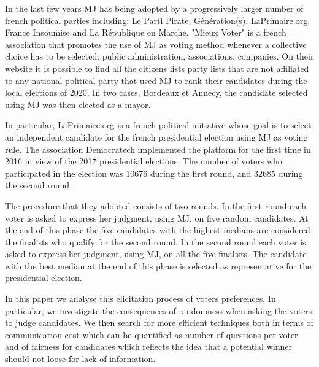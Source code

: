 In the last few years \ac{MJ} has being adopted by a progressively larger number of french political parties including: Le Parti Pirate, Génération(s), LaPrimaire.org, France Insoumise and La République en Marche.
"Mieux Voter" \citep{MV} is a french association that promotes the use of \ac{MJ} as voting method whenever a collective choice has to be selected: public administration, associations, companies. On their website it is possible to find all the citizens lists \textendash party lists that are not affiliated to any national political party \textemdash that used \ac{MJ} to rank their candidates during the local elections of 2020. In two cases, Bordeaux et Annecy, the candidate selected using \ac{MJ} was then elected as a mayor. 

In particular, LaPrimaire.org \citep{LaPrimaire} is a french political initiative whose goal is to select an independent candidate for the french presidential election using \ac{MJ} as voting rule. The association Democratech implemented the platform for the first time in 2016 in view of the 2017 presidential elections. The number of voters who participated in the election was $10676$ during the first round, and $32685$ during the second round. 

The procedure that they adopted consists of two rounds. In the first round each voter is asked to express her judgment, using \ac{MJ}, on five random candidates. At the end of this phase the five candidates with the highest medians are considered the finalists who qualify for the second round. In the second round each voter is asked to express her judgment, using \ac{MJ}, on all the five finalists. The candidate with the best median at the end of this phase is selected as representative for the presidential election.

In this paper we analyse this elicitation process of voters preferences. In particular, we investigate the consequences of randomness when asking the voters to judge candidates. We then search for more efficient techniques both in terms of communication cost \textemdash which can be quantified as number of questions per voter \textemdash and of fairness for candidates \textemdash which reflects the idea that a potential winner should not loose for lack of information.


